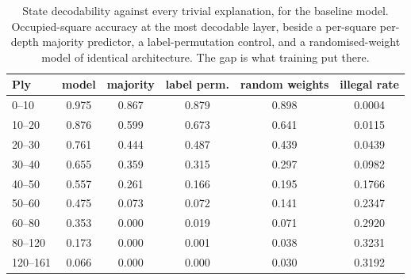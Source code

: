 \begin{table}[t]
\centering\small
\caption{State decodability against every trivial explanation, for the
baseline model. Occupied-square accuracy at the most decodable layer,
beside a per-square per-depth majority predictor, a label-permutation
control, and a randomised-weight model of identical architecture. The gap
is what training put there.}
\label{tab:controls}
\begin{tabular}{lccccc}
\toprule
Ply & model & majority & label perm. & random weights & illegal rate \\
\midrule
0--10 & 0.975 & 0.867 & 0.879 & 0.898 & 0.0004 \\
10--20 & 0.876 & 0.599 & 0.673 & 0.641 & 0.0115 \\
20--30 & 0.761 & 0.444 & 0.487 & 0.439 & 0.0439 \\
30--40 & 0.655 & 0.359 & 0.315 & 0.297 & 0.0982 \\
40--50 & 0.557 & 0.261 & 0.166 & 0.195 & 0.1766 \\
50--60 & 0.475 & 0.073 & 0.072 & 0.141 & 0.2347 \\
60--80 & 0.353 & 0.000 & 0.019 & 0.071 & 0.2920 \\
80--120 & 0.173 & 0.000 & 0.001 & 0.038 & 0.3231 \\
120--161 & 0.066 & 0.000 & 0.000 & 0.030 & 0.3192 \\
\bottomrule
\end{tabular}
\end{table}
